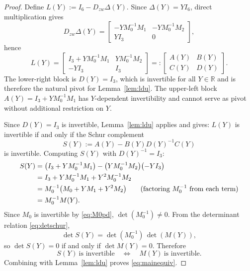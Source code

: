 \documentclass[11pt]{article}
\begin{document}
\begin{proof}
Define $L(Y) := I_6 - D_{zw}\Delta(Y)$.
Since $\Delta(Y) = YI_6$, direct multiplication gives
\begin{equation}
    D_{zw}\Delta(Y)
    =
    \begin{bmatrix}
        -YM_0^{-1}M_1 & -YM_0^{-1}M_2 \\
        YI_3 & 0
    \end{bmatrix},
\end{equation}
hence
\begin{equation}
    L(Y)
    =
    \begin{bmatrix}
        I_3 + YM_0^{-1}M_1 & YM_0^{-1}M_2 \\
        -YI_3 & I_3
    \end{bmatrix}
    =:
    \begin{bmatrix}
        A(Y) & B(Y) \\ C(Y) & D(Y)
    \end{bmatrix}.
    \label{eq:LY}
\end{equation}
The lower-right block is $D(Y) = I_3$, which is invertible for all $Y\in\mathbb{R}$
and is therefore the natural pivot for Lemma~\ref{lem:ldu}.
The upper-left block $A(Y) = I_3 + YM_0^{-1}M_1$ has $Y$-dependent invertibility
and cannot serve as pivot without additional restriction on $Y$.

Since $D(Y) = I_3$ is invertible, Lemma~\ref{lem:ldu} applies and gives:
$L(Y)$ is invertible if and only if the Schur complement
\begin{equation}
    S(Y) := A(Y) - B(Y)D(Y)^{-1}C(Y)
\end{equation}
is invertible.  Computing $S(Y)$ with $D(Y)^{-1} = I_3$:
\begin{align}
    S(Y)
    &= \bigl(I_3 + YM_0^{-1}M_1\bigr)
       - \bigl(YM_0^{-1}M_2\bigr)\bigl(-YI_3\bigr) \notag\\
    &= I_3 + YM_0^{-1}M_1 + Y^2M_0^{-1}M_2 \notag\\
    &= M_0^{-1}\bigl(M_0 + YM_1 + Y^2M_2\bigr)
       \qquad\text{(factoring } M_0^{-1}\text{ from each term)} \notag\\
    &= M_0^{-1}M(Y).
    \label{eq:SY}
\end{align}
Since $M_0$ is invertible by \eqref{eq:M0pd}, $\det(M_0^{-1})\neq 0$.
From the determinant relation \eqref{eq:detschur},
\begin{equation}
    \det S(Y) = \det(M_0^{-1})\,\det(M(Y)),
\end{equation}
so $\det S(Y) = 0$ if and only if $\det M(Y) = 0$.  Therefore
\begin{equation}
    S(Y)\ \text{is invertible}
    \quad\Longleftrightarrow\quad
    M(Y)\ \text{is invertible}.
\end{equation}
Combining with Lemma~\ref{lem:ldu} proves \eqref{eq:mainequiv}.
\end{proof}
\end{document}
